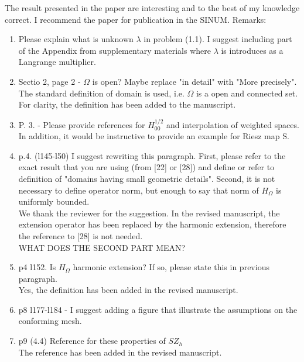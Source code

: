 \documentclass{article}
\newcommand{\fede}[1]{{\color{green!55!blue}#1}}
\begin{document}
The result presented in the paper are interesting and to the best of my knowledge correct. I recommend the paper for publication in the SINUM.
Remarks:
\begin{enumerate}
    \item Please explain what is unknown $\lambda$ in problem (1.1). I suggest including part of the Appendix from supplementary materials where $\lambda$ is introduces as a Langrange multiplier.
    \item Sectio 2, page 2 - $\Omega$ is open? Maybe replace "in detail" with "More precisely".\\
    \fede{The standard definition of domain is used, i.e. $\Omega$ is a open and connected set. For clarity, the definition has been added to the manuscript. }
    \item P. 3. - Please provide references for $H^{1/2}_{00}$ and interpolation of weighted spaces. In addition, it would be instructive to provide an example for Riesz map S.
    \item p.4. (l145-l50) I suggest rewriting this paragraph. First, please refer to the exact result that you are using (from [22] or [28]) and define or refer to definition of "domains having small geometric details". Second, it is not necessary to define operator norm, but enough to say that norm of $H_{\Omega}$ is uniformly bounded.\\
    \fede{We thank the reviewer for the suggestion. In the revised manuscript, the extension operator has been replaced by the harmonic extension, therefore the reference to [28] is not needed.\\
    WHAT DOES THE SECOND PART MEAN? }
    \item p4 l152. Is $H_{\Omega}$ harmonic extension? If so, please state this in previous paragraph.\\
    \fede{Yes, the definition has been added in the revised manuscript.}
    \item p8 l177-l184 - I suggest adding a figure that illustrate the assumptions on the conforming mesh.
    \item p9 (4.4) Reference for these properties of $SZ_h$\\
    \fede{The reference has been added in the revised manuscript.\\
    
}
\end{enumerate}
\end{document}
